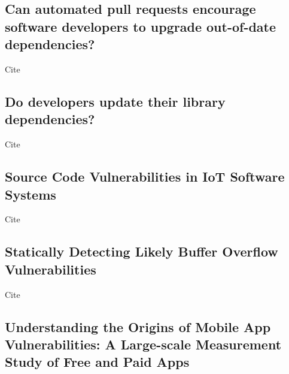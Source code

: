 \subsection{Can automated pull requests encourage software developers to upgrade out-of-date dependencies?}
\label{subsec:can-automated-pull-requests-encourage-software-developers-to-upgrade-out-of-date-dependencies?}

Cite~\cite{mirhosseini2017}



\subsection{Do developers update their library dependencies?}
\label{subsec:do-developers-update-their-library-dependencies?}

Cite~\cite{kula2017}



\subsection{Source Code Vulnerabilities in IoT Software Systems}
\label{subsec:source-code-vulnerabilities-in-iot-software-systems}

Cite~\cite{alnaeli2017}



\subsection{Statically Detecting Likely Buffer Overflow Vulnerabilities}
\label{subsec:statically-detecting-likely-buffer-overflow-vulnerabilities}

Cite~\cite{larochelle2001}



\subsection{Understanding the Origins of Mobile App Vulnerabilities: A Large-scale Measurement Study of Free and Paid Apps}
\label{subsec:understanding-the-origins-of-mobile-app-vulnerabilities:-a-large-scale-measurement-study-of-free-and-paid-apps}

